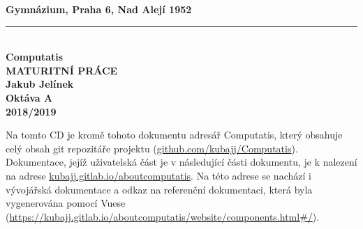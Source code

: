 \begin{titlepage}
    \begin{center}
        \textbf{\large Gymnázium, Praha 6, Nad Alejí 1952}\\
        \vspace{0.2cm}
        \rule{\textwidth}{0.5pt}\\
        \vspace{5cm}
        \textbf{\Huge Computatis}\\
        \vspace{5cm}
        \textbf{\large MATURITNÍ PRÁCE}\\
        \vspace{2cm}
        \textbf{\large Jakub Jelínek}\\
        \textbf{Oktáva A}\\
        \vspace*{\fill}
        \textbf{\large 2018/2019}\\
    \end{center}
\end{titlepage}
\newpage
Na tomto CD je kromě tohoto dokumentu adresář Computatis, který obsahuje
celý obsah git repozitáře projektu (\href{https://github.com/kubajj/Computatis}{github.com/kubajj/Computatis}). 
Dokumentace, jejíž uživatelská část je v následující části dokumentu, je k nalezení na
adrese \href{https://kubajj.gitlab.io/aboutcomputatis}{kubajj.gitlab.io/aboutcomputatis}. Na této adrese se nachází i vývojářská
dokumentace a odkaz na referenční dokumentaci, která byla vygenerována pomocí Vuese (\url{https://kubajj.gitlab.io/aboutcomputatis/website/components.html#/}).
\newpage
